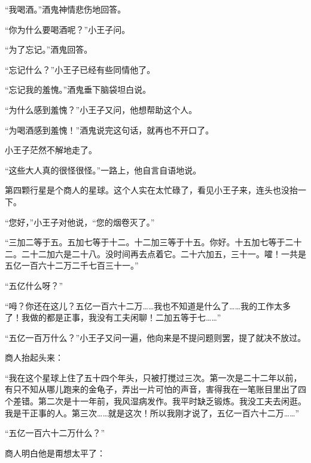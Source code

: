 {\startalignment[center]
 \stopalignment}

“我喝酒。”酒鬼神情悲伤地回答。

“你为什么要喝酒呢？”小王子问。

“为了忘记。”酒鬼回答。

“忘记什么？”小王子已经有些同情他了。

“忘记我的羞愧。”酒鬼垂下脑袋坦白说。

“为什么感到羞愧？”小王子又问，他想帮助这个人。

“为喝酒感到羞愧！”酒鬼说完这句话，就再也不开口了。

小王子茫然不解地走了。

“这些大人真的很怪很怪。”一路上，他自言自语地说。

{\startalignment[center]
 \stopalignment}


\stoptitle

\starttitle[title={13},reference={part0015.html_a016}]

第四颗行星是个商人的星球。这个人实在太忙碌了，看见小王子来，连头也没抬一下。

“您好，”小王子对他说，“您的烟卷灭了。”

“三加二等于五。五加七等于十二。十二加三等于十五。你好。十五加七等于二十二。二十二加六是二十八。没时间再去点着它。二十六加五，三十一。嚯！一共是五亿一百六十二万二千七百三十一。”

“五亿什么呀？”

“呣？你还在这儿？五亿一百六十二万\ldots{}\ldots{}我也不知道是什么了\ldots{}\ldots{}我的工作太多了！我做的都是正事，我没有工夫闲聊！二加五等于七\ldots{}\ldots{}”

“五亿一百万什么？”小王子又问一遍，他向来是不提问题则罢，提了就决不放过。

商人抬起头来：

“我在这个星球上住了五十四个年头，只被打搅过三次。第一次是二十二年以前，有只不知从哪儿跑来的金龟子，弄出一片可怕的声音，害得我在一笔账目里出了四个差错。第二次是十一年前，我风湿病发作。我平时缺乏锻炼。我没工夫去闲逛。我是干正事的人。第三次\ldots{}\ldots{}就是这次！所以我刚才说了，五亿一百六十二万\ldots{}\ldots{}”

“五亿一百六十二万什么？”

商人明白他是甭想太平了：

